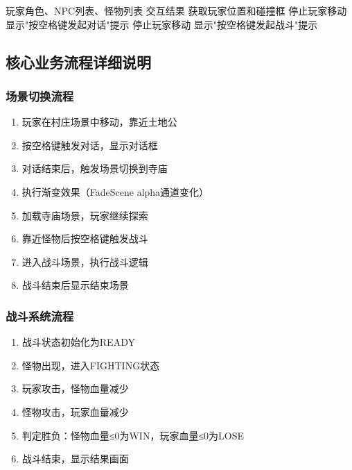 \documentclass[12pt,a4paper]{article}
\begin{document}
\begin{algorithm}[H]
\caption{玩家交互流程}
\begin{algorithmic}[1]
\REQUIRE 玩家角色、NPC列表、怪物列表
\ENSURE 交互结果
\STATE 获取玩家位置和碰撞框
        \STATE 停止玩家移动
            \STATE 显示"按空格键发起对话"提示
        \ENDIF
    \ENDIF
\ENDFOR
{}
        \STATE 停止玩家移动
            \STATE 显示"按空格键发起战斗"提示
        \ENDIF
    \ENDIF
\ENDFOR
\end{algorithmic}
\end{algorithm}

\subsection{核心业务流程详细说明}

\subsubsection{场景切换流程}

\begin{enumerate}[label=\arabic*.]
    \item 玩家在村庄场景中移动，靠近土地公
    \item 按空格键触发对话，显示对话框
    \item 对话结束后，触发场景切换到寺庙
    \item 执行渐变效果（FadeScene alpha通道变化）
    \item 加载寺庙场景，玩家继续探索
    \item 靠近怪物后按空格键触发战斗
    \item 进入战斗场景，执行战斗逻辑
    \item 战斗结束后显示结束场景
\end{enumerate}

\subsubsection{战斗系统流程}

\begin{enumerate}[label=\arabic*.]
    \item 战斗状态初始化为READY
    \item 怪物出现，进入FIGHTING状态
    \item 玩家攻击，怪物血量减少
    \item 怪物攻击，玩家血量减少
    \item 判定胜负：怪物血量≤0为WIN，玩家血量≤0为LOSE
    \item 战斗结束，显示结果画面
\end{enumerate}
\end{document}
